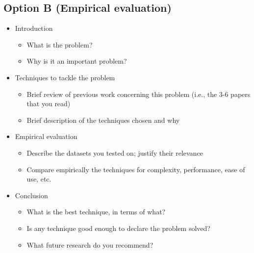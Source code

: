 \documentclass{article}
\begin{document}
\subsection*{Option B (Empirical evaluation)}
\begin{itemize}
\item Introduction
	\begin{itemize}
	\item What is the problem?
	\item Why is it an important problem?
	\end{itemize}
\item Techniques to tackle the problem
	\begin{itemize}
	\item Brief review of previous work concerning this problem (i.e., the 3-6 papers that you read)
	\item Brief description of the techniques chosen and why
	\end{itemize}
\item Empirical evaluation
	\begin{itemize}
	\item Describe the datasets you tested on; justify their relevance
	\item Compare empirically the techniques for complexity, performance, ease of use, etc.
	\end{itemize}
\item Conclusion
	\begin{itemize}
	\item What is the best technique, in terms of what?
	\item Is any technique good enough to declare the problem solved?
	\item What future research do you recommend?
	\end{itemize}
\end{itemize}
\end{document}

